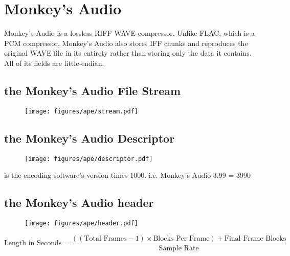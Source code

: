 
\chapter{Monkey's Audio}
Monkey's Audio is a lossless RIFF WAVE compressor.
Unlike FLAC, which is a PCM compressor, Monkey's Audio also stores
IFF chunks and reproduces the original WAVE file in its entirety rather
than storing only the data it contains.
All of its fields are little-endian.

\section{the Monkey's Audio File Stream}
\begin{figure}[h]
\texttt{[image: figures/ape/stream.pdf]}
\end{figure}

\section{the Monkey's Audio Descriptor}
\begin{figure}[h]
\texttt{[image: figures/ape/descriptor.pdf]}
\end{figure}
\par
\noindent
{} is the encoding software's version times 1000.
i.e. Monkey's Audio 3.99 = 3990

\section{the Monkey's Audio header}
\begin{figure}[h]
\texttt{[image: figures/ape/header.pdf]}
\end{figure}
{
\begin{equation}
\text{Length in Seconds} = \frac{((\text{Total Frames} - 1) \times \text{Blocks Per Frame}) + \text{Final Frame Blocks}}{\text{Sample Rate}}
\end{equation}
}
